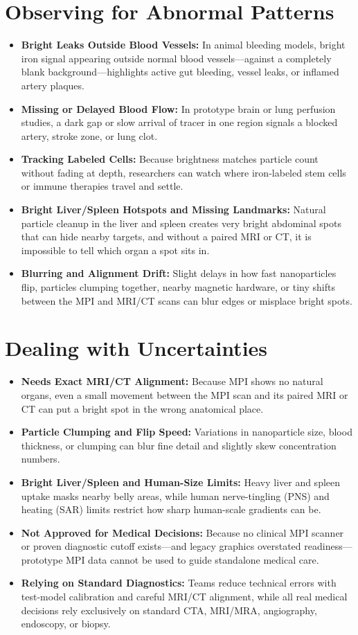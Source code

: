 \section{Observing for Abnormal Patterns}
\begin{itemize}
  \item \textbf{Bright Leaks Outside Blood Vessels:} In animal bleeding models, bright iron signal appearing outside normal blood vessels---against a completely blank background---highlights active gut bleeding, vessel leaks, or inflamed artery plaques.
  \item \textbf{Missing or Delayed Blood Flow:} In prototype brain or lung perfusion studies, a dark gap or slow arrival of tracer in one region signals a blocked artery, stroke zone, or lung clot.
  \item \textbf{Tracking Labeled Cells:} Because brightness matches particle count without fading at depth, researchers can watch where iron-labeled stem cells or immune therapies travel and settle.
  \item \textbf{Bright Liver/Spleen Hotspots and Missing Landmarks:} Natural particle cleanup in the liver and spleen creates very bright abdominal spots that can hide nearby targets, and without a paired MRI or CT, it is impossible to tell which organ a spot sits in.
  \item \textbf{Blurring and Alignment Drift:} Slight delays in how fast nanoparticles flip, particles clumping together, nearby magnetic hardware, or tiny shifts between the MPI and MRI/CT scans can blur edges or misplace bright spots.
\end{itemize}

\section{Dealing with Uncertainties}
\begin{itemize}
  \item \textbf{Needs Exact MRI/CT Alignment:} Because MPI shows no natural organs, even a small movement between the MPI scan and its paired MRI or CT can put a bright spot in the wrong anatomical place.
  \item \textbf{Particle Clumping and Flip Speed:} Variations in nanoparticle size, blood thickness, or clumping can blur fine detail and slightly skew concentration numbers.
  \item \textbf{Bright Liver/Spleen and Human-Size Limits:} Heavy liver and spleen uptake masks nearby belly areas, while human nerve-tingling (PNS) and heating (SAR) limits restrict how sharp human-scale gradients can be.
  \item \textbf{Not Approved for Medical Decisions:} Because no clinical MPI scanner or proven diagnostic cutoff exists---and legacy graphics overstated readiness---prototype MPI data cannot be used to guide standalone medical care.
  \item \textbf{Relying on Standard Diagnostics:} Teams reduce technical errors with test-model calibration and careful MRI/CT alignment, while all real medical decisions rely exclusively on standard CTA, MRI/MRA, angiography, endoscopy, or biopsy.
\end{itemize}

